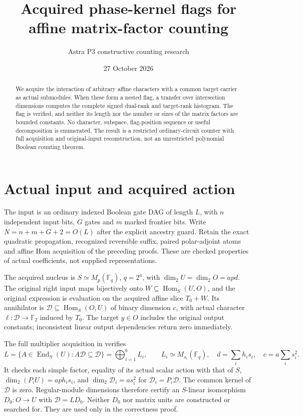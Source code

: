\documentclass[11pt]{article}
\title{Acquired phase-kernel flags for affine matrix-factor counting}
\author{Astra P3 constructive counting research}\date{27 October 2026}
\newcommand{\F}{\mathbb F}\newcommand{\rank}{\operatorname{rank}}
\newcommand{\Hom}{\operatorname{Hom}}
\begin{document}
\maketitle
\begin{abstract}
We acquire the interaction of arbitrary affine characters with a common
target carrier as actual submodules. When these form a nested flag, a
transfer over intersection dimensions computes the complete signed
dual-rank and target-rank histogram. The flag is verified, and neither its
length nor the number or sizes of the matrix factors are bounded constants.
No character, subspace, flag-position sequence or useful decomposition is
enumerated. The result is a restricted ordinary-circuit counter with full
acquisition and original-input reconstruction, not an unrestricted
polynomial Boolean counting theorem.
\end{abstract}

\section{Actual input and acquired action}
The input is an ordinary indexed Boolean gate DAG of length $L$, with
$n$ independent input bits, $G$ gates and $m$ marked frontier bits.
Write $N=n+m+G+2=O(L)$ after the explicit ancestry guard. Retain the exact
quadratic propagation, recognized reversible suffix, paired polar-adjoint
atoms and affine Hom acquisition of the preceding proofs. These are checked
properties of actual coefficients, not supplied representations.

The acquired nucleus is $S\simeq M_p(\F_q)$, $q=2^a$, with
$\dim_2U=\dim_2O=apd$. The original right input maps bijectively onto
$W\subseteq\Hom_S(U,O)$, and the original expression is evaluation on
the acquired affine slice $T_0+W$. Its annihilator is
$\mathcal D\subseteq\Hom_S(O,U)$ of binary dimension $c$, with actual
character $\ell:\mathcal D\to\F_2$ induced by $T_0$.
The target $y\in O$ includes the original output constants; inconsistent
linear output dependencies return zero immediately.

The full multiplier acquisition in
 verifies
\[
 L=\{A\in\operatorname{End}_S(U):A\mathcal D\subseteq\mathcal D\}
   =\bigoplus_{i=1}^b L_i,\qquad L_i\simeq M_{s_i}(\F_q),
 \quad d=\sum_i h_i s_i,\quad c=a\sum_i s_i^2.
\]
It checks each simple factor, equality of its actual scalar action with
that of $S$, $\dim_2(P_iU)=ap h_i s_i$, and
$\dim_2\mathcal D_i=as_i^2$ for $\mathcal D_i=P_i\mathcal D$.
The common kernel of $\mathcal D$ is zero. Regular-module dimensions
therefore certify an $S$-linear isomorphism $D_0:O\to U$ with
$\mathcal D=LD_0$. Neither $D_0$ nor matrix units are constructed or
searched for. They are used only in the correctness proof.
\end{document}
